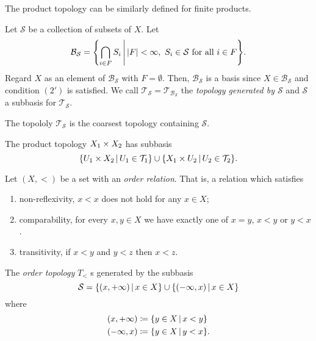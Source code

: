 \documentclass[12pt]{book} %
\newcommand{\T}{\mathcal T}
\newcommand{\B}{\mathcal B}
\begin{document}
\begin{note}
The product topology can be similarly defined for finite products.
\end{note}

\begin{definition}
Let \( \mathcal S \) be a collection of subsets of \( X \).
Let \[ \B_\mathcal S = \set*{\bigcap_{i \in F} S_i \given* \card F < \infty,\ S_i \in \mathcal S \text{ for all \( i \in F \)}}. \]
Regard \( X \) as an element of \( \B_\mathcal S \) with \( F = \emptyset \).
Then, \( \B_\mathcal S \) is a basis since \( X \in \B_\mathcal S \) and condition \( (2') \) is satisfied.
We call \( \T_\mathcal S = \T_{\B_\mathcal S} \) the \emph{topology generated by \( \mathcal S \)} and \( \mathcal S \) a subbasis for \( \T_\mathcal S \).
\end{definition}

\begin{note}
The topololy \( \T_\mathcal S \) is the coarsest topology containing \( \mathcal S \).
\end{note}

\begin{example}
The product topology \( X_1 \times X_2 \) has subbasis
\[ \set{U_1 \cross X_2 \given U_1 \in \T_1} \cup \set{X_1 \cross U_2 \given U_2 \in \T_2}. \]
\end{example}

\begin{definition}
Let \( (X, <) \) be a set with an \emph{order relation}.
That is, a relation which satisfies
\begin{enumerate}
\item non-reflexivity, \ie \( x < x \) does not hold for any \( x \in X \);
\item comparability, \ie for every \( x, y \in X \) we have exactly one of \( x = y \), \( x < y \) or \( y < x \).
\item transitivity, \ie if \( x < y \) and \( y < z \) then \( x < z \).
\end{enumerate}
The \emph{order topology} \( T_< \) s generated by the subbasis
\[ \mathcal S = \set{(x, +\infty) \given x \in X} \cup \set{(-\infty, x) \given x \in X} \]
where
\begin{align*}
(x, +\infty) &\coloneqq \set{y \in X \given x < y} \\
(-\infty, x) &\coloneqq \set{y \in X \given y < x}.
\end{align*}
\end{definition}
\end{document}
